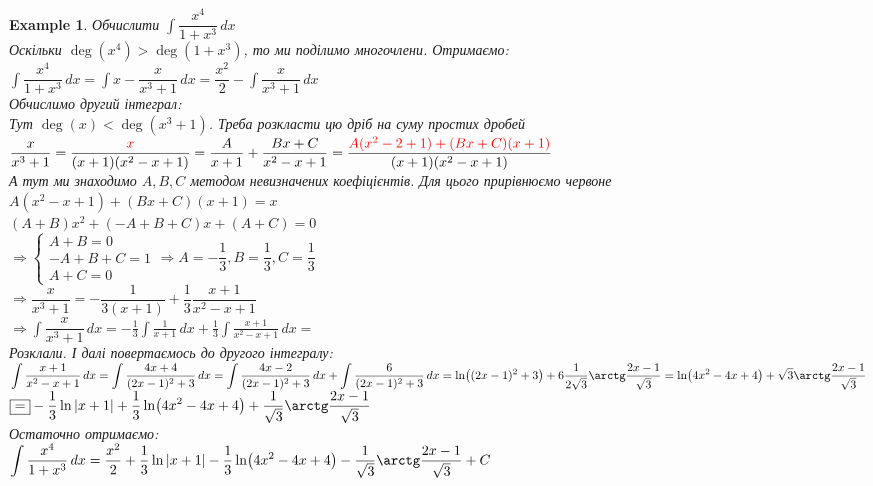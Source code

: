 \documentclass[a4paper, 14pt]{extarticle}
\def\huge{\displaystyle}
\theoremstyle{theoremdd}
\theoremstyle{theoremdd}
\theoremstyle{theoremdd}
\theoremstyle{theoremdd}
\newtheorem{example}[theorem]{Example}
\theoremstyle{theoremdd}
\theoremstyle{theoremdd}
\theoremstyle{theoremdd}
\theoremstyle{theoremdd}
\begin{document}
\begin{example} 
Обчислити $\huge \int \dfrac{x^4}{1+x^3}\,dx$\\
Оскільки $\deg(x^4) > \deg(1+x^3)$, то ми поділимо многочлени. Отримаємо:\\
$\huge \int \dfrac{x^4}{1+x^3}\,dx = \int x - \dfrac{x}{x^3+1}\,dx = \dfrac{x^2}{2} - \int \dfrac{x}{x^3+1}\,dx$\\
Обчислимо другий інтеграл:\\
Тут $\deg(x) < \deg(x^3+1)$. Треба розкласти цю дріб на суму простих дробей\\
$\dfrac{x}{x^3+1} = \dfrac{\textcolor{red}{x}}{(x+1)(x^2-x+1)} = \dfrac{A}{x+1} + \dfrac{Bx+C}{x^2-x+1} = \dfrac{\textcolor{red}{A(x^2-2+1) + (Bx+C)(x+1)}}{(x+1)(x^2-x+1)}$\\
А тут ми знаходимо $A,B,C$ методом невизначених коефіцієнтів. Для цього прирівнюємо червоне\\
$A(x^2-x+1) + (Bx+C)(x+1) = x$\\
$(A+B)x^2 + (-A+B+C)x + (A+C) = 0$\\
$\Rightarrow \begin{cases}
A + B = 0 \\
-A + B + C = 1\\
A + C = 0
\end{cases} \Rightarrow A = -\dfrac{1}{3}, B = \dfrac{1}{3}, C = \dfrac{1}{3}$\\
$\Rightarrow \dfrac{x}{x^3+1} = -\dfrac{1}{3(x+1)} + \dfrac{1}{3} \dfrac{x+1}{x^2-x+1}$\\
$\Rightarrow \huge \int \dfrac{x}{x^3+1}\,dx = -\frac{1}{3} \int \frac{1}{x+1}\,dx + \frac{1}{3} \int \frac{x+1}{x^2-x+1}\,dx \boxed{=}$\\
Розклали. І далі повертаємось до другого інтегралу: \bigskip \\
$\huge \int \frac{x+1}{x^2-x+1}\,dx = \int \frac{4x+4}{(2x-1)^2 + 3}\,dx = \int \frac{4x-2}{(2x-1)^2 +3}\,dx + \int \frac{6}{(2x-1)^2 +3}\,dx = \ln((2x-1)^2+3) + 6 \dfrac{1}{2\sqrt{3}} \arctg \dfrac{2x-1}{\sqrt{3}} = \ln(4x^2-4x+4) + \sqrt{3} \arctg \dfrac{2x-1}{\sqrt{3}}$\\
$\boxed{=} \huge -\dfrac{1}{3} \ln|x+1| + \dfrac{1}{3} \ln(4x^2-4x+4) + \dfrac{1}{\sqrt{3}} \arctg \dfrac{2x-1}{\sqrt{3}}$\\
Остаточно отримаємо:\\
$\huge \int \dfrac{x^4}{1+x^3}\,dx = \dfrac{x^2}{2} + \dfrac{1}{3} \ln|x+1| - \dfrac{1}{3} \ln(4x^2-4x+4) - \dfrac{1}{\sqrt{3}} \arctg \dfrac{2x-1}{\sqrt{3}} + C$
\end{example}
\end{document}
